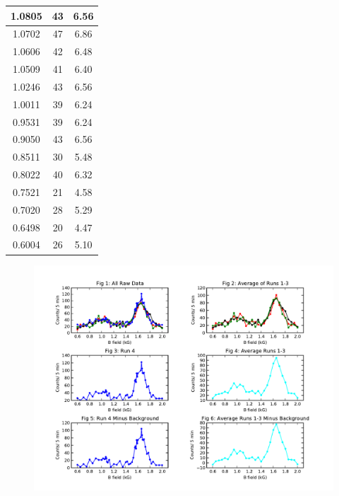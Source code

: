 \begin{table}[h!]
\begin{tabular}{|c|c|c|}
1.0805	&	43	&	6.56	\\ \hline
1.0702	&	47	&	6.86	\\ \hline
1.0606	&	42	&	6.48	\\ \hline
1.0509	&	41	&	6.40	\\ \hline
1.0246	&	43	&	6.56	\\ \hline
1.0011	&	39	&	6.24	\\ \hline
0.9531	&	39	&	6.24	\\ \hline
0.9050	&	43	&	6.56	\\ \hline
0.8511	&	30	&	5.48	\\ \hline
0.8022	&	40	&	6.32	\\ \hline
0.7521	&	21	&	4.58	\\ \hline
0.7020	&	28	&	5.29	\\ \hline
0.6498	&	20	&	4.47	\\ \hline
0.6004	&	26	&	5.10	\\ \hline
\end{tabular}
\end{table}
\begin{figure}[h!]
\begin{center}
\includegraphics[width=7.5in]{field_counts.pdf}
\end{center}
\end{figure}
  
